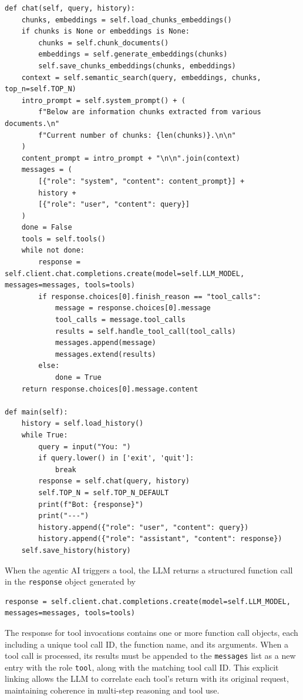 \begin{lstlisting}
def chat(self, query, history):
    chunks, embeddings = self.load_chunks_embeddings()
    if chunks is None or embeddings is None:
        chunks = self.chunk_documents()
        embeddings = self.generate_embeddings(chunks)
        self.save_chunks_embeddings(chunks, embeddings)
    context = self.semantic_search(query, embeddings, chunks, top_n=self.TOP_N)
    intro_prompt = self.system_prompt() + (
        f"Below are information chunks extracted from various documents.\n"
        f"Current number of chunks: {len(chunks)}.\n\n"
    )
    content_prompt = intro_prompt + "\n\n".join(context)
    messages = (
        [{"role": "system", "content": content_prompt}] + 
        history +
        [{"role": "user", "content": query}]
    )
    done = False
    tools = self.tools()
    while not done:
        response = self.client.chat.completions.create(model=self.LLM_MODEL, messages=messages, tools=tools)
        if response.choices[0].finish_reason == "tool_calls":
            message = response.choices[0].message
            tool_calls = message.tool_calls
            results = self.handle_tool_call(tool_calls)
            messages.append(message)
            messages.extend(results)
        else:
            done = True
    return response.choices[0].message.content

def main(self):
    history = self.load_history()
    while True:
        query = input("You: ")
        if query.lower() in ['exit', 'quit']:
            break
        response = self.chat(query, history)
        self.TOP_N = self.TOP_N_DEFAULT
        print(f"Bot: {response}")
        print("---")
        history.append({"role": "user", "content": query})
        history.append({"role": "assistant", "content": response})
    self.save_history(history)
\end{lstlisting}

When the agentic AI triggers a tool, the LLM returns a structured function call in the \verb|response| object generated by
\begin{lstlisting}
response = self.client.chat.completions.create(model=self.LLM_MODEL, messages=messages, tools=tools)
\end{lstlisting}
The response for tool invocations contains one or more function call objects, each including a unique tool call ID, the function name, and its arguments. When a tool call is processed, its results must be appended to the \verb|messages| list as a new entry with the role \verb|tool|, along with the matching tool call ID. This explicit linking allows the LLM to correlate each tool’s return with its original request, maintaining coherence in multi-step reasoning and tool use.

